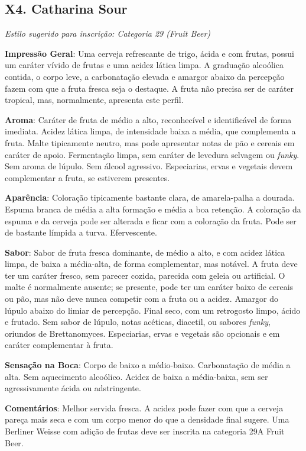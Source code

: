 \subsection*{X4. Catharina Sour}

\textit{Estilo sugerido para inscrição: Categoria 29 (Fruit Beer)}

\textbf{Impressão Geral}: Uma cerveja refrescante de trigo, ácida e com frutas, possui um caráter vívido de frutas e uma acidez lática limpa. A graduação alcoólica contida, o corpo leve, a carbonatação elevada e amargor abaixo da percepção fazem com que a fruta fresca seja o destaque. A fruta não precisa ser de caráter tropical, mas, normalmente, apresenta este perfil.

\textbf{Aroma}: Caráter de fruta de médio a alto, reconhecível e identificável de forma imediata. Acidez lática limpa, de intensidade baixa a média, que complementa a fruta. Malte tipicamente neutro, mas pode apresentar notas de pão e cereais em caráter de apoio. Fermentação limpa, sem caráter de levedura selvagem ou \textit{funky}. Sem aroma de lúpulo. Sem álcool agressivo. Especiarias, ervas e vegetais devem complementar a fruta, se estiverem presentes.

\textbf{Aparência}: Coloração tipicamente bastante clara, de amarela-palha a dourada. Espuma branca de média a alta formação e média a boa retenção. A coloração da espuma e da cerveja pode ser alterada e ficar com a coloração da fruta. Pode ser de bastante límpida a turva. Efervescente.

\textbf{Sabor}: Sabor de fruta fresca dominante, de médio a alto, e com acidez lática limpa, de baixa a média-alta, de forma complementar, mas notável. A fruta deve ter um caráter fresco, sem parecer cozida, parecida com geleia ou artificial. O malte é normalmente ausente; se presente, pode ter um caráter baixo de cereais ou pão, mas não deve nunca competir com a fruta ou a acidez. Amargor do lúpulo abaixo do limiar de percepção. Final seco, com um retrogosto limpo, ácido e frutado. Sem sabor de lúpulo, notas acéticas, diacetil, ou sabores \textit{funky}, oriundos de Brettanomyces. Especiarias, ervas e vegetais são opcionais e em caráter complementar à fruta.

\textbf{Sensação na Boca}: Corpo de baixo a médio-baixo. Carbonatação de média a alta. Sem aquecimento alcoólico. Acidez de baixa a média-baixa, sem ser agressivamente ácida ou adstringente.

\textbf{Comentários}: Melhor servida fresca. A acidez pode fazer com que a cerveja pareça mais seca e com um corpo menor do que a densidade final sugere. Uma Berliner Weisse com adição de frutas deve ser inscrita na categoria 29A Fruit Beer.

